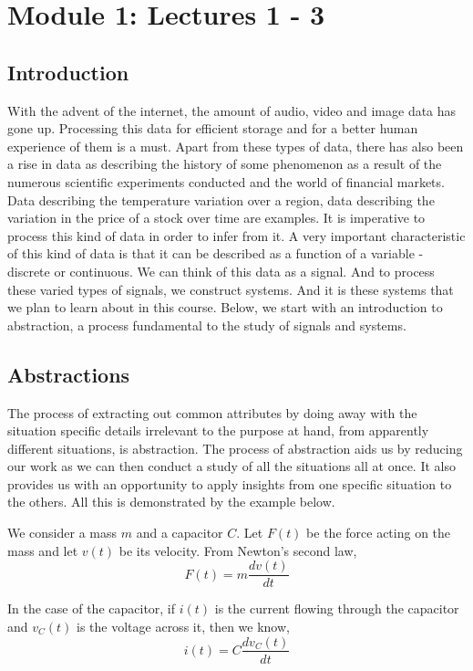 \section{Module 1: Lectures 1 - 3}


\subsection{Introduction}
With the advent of the internet, the amount of audio, video and image data has gone up. Processing this data for efficient storage and for a better human experience of them is a must. Apart from these types of data, there has also been a rise in data as describing the history of some phenomenon as a result of the numerous scientific experiments conducted and the world of financial markets. Data describing the temperature variation over a region, data describing the variation in the price of a stock over time are examples. It is imperative to process this kind of data in order to infer from it. A very important characteristic of this kind of data is that it can be described as a function of a variable - discrete or continuous. We can think of this data as a signal. And to process these varied types of signals, we construct systems. And it is these systems that we plan to learn about in this course. Below, we start with an introduction to abstraction, a process fundamental to the study of signals and systems.

\subsection{Abstractions}
The process of extracting out common attributes by doing away with the situation specific details irrelevant to the purpose at hand, from apparently different situations, is abstraction. The process of abstraction aids us by reducing our work as we can then conduct a study of all the situations all at once. It also provides us with an opportunity to apply insights from one specific situation to the others. All this is demonstrated by the example below.

We consider a mass $m$ and a capacitor $C$. Let $F(t)$ be the force acting on the mass and let $v(t)$ be its velocity. From Newton's second law,
\[
F(t) = m\frac{dv(t)}{dt}
\]

In the case of the capacitor, if $i(t)$ is the current flowing through the capacitor and $v_{C}(t)$ is the voltage across it, then we know,
\[
i(t) = C\frac{dv_{C}(t)}{dt}
\]

